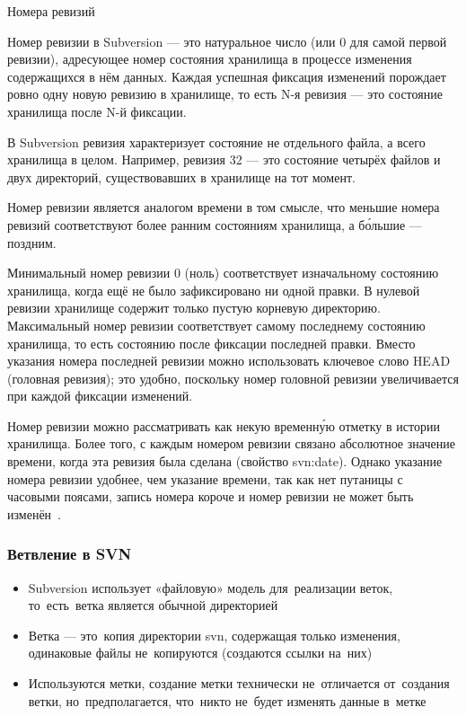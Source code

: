 \documentclass{../industrial-development}
\begin{document}
\lecturenotes

Номера ревизий

Номер ревизии в Subversion — это натуральное число (или 0 для самой первой ревизии), адресующее номер состояния хранилища в процессе изменения содержащихся в нём данных. Каждая успешная фиксация изменений порождает ровно одну новую ревизию в хранилище, то есть N-я ревизия — это состояние хранилища после N-й фиксации.

В Subversion ревизия характеризует состояние не отдельного файла, а всего хранилища в целом. Например, ревизия 32 — это состояние четырёх файлов и двух директорий, существовавших в хранилище на тот момент.

Номер ревизии является аналогом времени в том смысле, что меньшие номера ревизий соответствуют более ранним состояниям хранилища, а бо́льшие — поздним.

Минимальный номер ревизии 0 (ноль) соответствует изначальному состоянию хранилища, когда ещё не было зафиксировано ни одной правки. В нулевой ревизии хранилище содержит только пустую корневую директорию.
Максимальный номер ревизии соответствует самому последнему состоянию хранилища, то есть состоянию после фиксации последней правки. Вместо указания номера последней ревизии можно использовать ключевое слово HEAD (головная ревизия); это удобно, поскольку номер головной ревизии увеличивается при каждой фиксации изменений.

Номер ревизии можно рассматривать как некую временну́ю отметку в истории хранилища. Более того, с каждым номером ревизии связано абсолютное значение времени, когда эта ревизия была сделана (свойство svn:date). Однако указание номера ревизии удобнее, чем указание времени, так как нет путаницы с часовыми поясами, запись номера короче и номер ревизии не может быть изменён~\cite{SVNWikipedia}.

\begin{frame} \frametitle{Ветвление в SVN}
  
  \begin{itemize}
  \item Subversion использует «файловую» модель для~реализации веток, то~есть~ветка является обычной директорией
  \item Ветка --- это~копия директории svn, содержащая только изменения, одинаковые файлы не~копируются (создаются ссылки на~них)
  \item Используются метки, создание метки технически не~отличается от~создания ветки, но~предполагается, что~никто не~будет изменять данные в~метке
  \end{itemize}
\end{frame}
\end{document}
